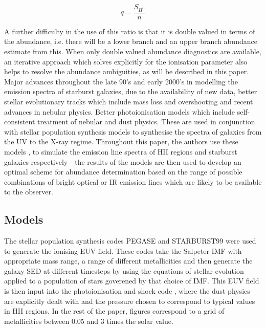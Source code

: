 \documentclass{literature}
\begin{document}
\begin{equation}
	q = \frac{S_{H^{0}}}{n}
\end{equation}

A further difficulty in the use of this ratio is that it is double valued in terms of the abundance, i.e. there will be a lower branch and an upper branch abundance estimate from this. When only double valued abundance diagnostics are available, an iterative approach which solves explicitly for the ionisation parameter also helps to resolve the abundance ambiguities, as will be described in this paper. \\

Major advances throughout the late 90's and early 2000's in modelling the emission spectra of starburst galaxies, due to the availability of new data, better stellar evolutionary tracks which include mass loss and overshooting and recent advances in nebular physics. Better photoionisation models which include self-consistent treatment of nebular and dust physics. These are used in conjunction with stellar population synthesis models to synthesise the spectra of galaxies from the UV to the X-ray regime. Throughout this paper, the authors use these models \citep{Dopita_2000}, \citep{Kewley_2001} to simulate the emission line spectra of HII regions and starburst galaxies respectively - the results of the models are then used to develop an optimal scheme for abundance determination based on the range of possible combinations of bright optical or IR emission lines which are likely to be available to the observer. \\

\subsection{Models}
The stellar population synthesis codes PEGASE \citep{Fioc_1997} and STARBURST99 \citep{Leitherer_1999} were used to generate the ionising EUV field. These codes take the Salpeter IMF with appropriate mass range, a range of different metallicities and then generate the galaxy SED at different timesteps by using the equations of stellar evolution applied to a population of stars goverened by that choice of IMF. This EUV field is then input into the photoionisation and shock code \citep{Sutherland_1993}, where the dust physics are explicitly dealt with and the pressure chosen to correspond to typical values in HII regions. In the rest of the paper, figures correspond to a grid of metallicities between 0.05 and 3 times the solar value.
\end{document}
